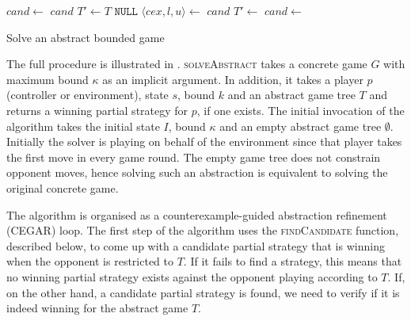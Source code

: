 \begin{algorithm}
    \begin{algorithmic}[1]
        \State $cand \gets $  
         \Return $cand$ \EndIIf {}
        \State $T' \gets T$
        \Loop
             
                \State \Return $\texttt{NULL}$
            \EndIf 
            \State $\langle cex, l, u \rangle \gets $  
             
                \State \Return $cand$ 
            \EndIf 
            \State $T' \gets $  
            \State $cand \gets $  
        \EndLoop
        \EndFunction
    \end{algorithmic}
    \caption{Solve an abstract bounded game}
    \label{alg:solveabstract}
\end{algorithm}


The full procedure is illustrated in . \textsc{solveAbstract} takes a concrete game $G$ with maximum bound $\kappa$ as an implicit argument.  In addition, it takes a player $p$ (controller or environment), state $s$, bound $k$ and an abstract game tree $T$ and returns a winning partial strategy for $p$, if one exists.  The initial invocation of the algorithm takes the initial state $I$, bound $\kappa$ and an empty abstract game tree $\emptyset$.  Initially the solver is playing on behalf of the environment since that player takes the first move in every game round.  The empty game tree does not constrain opponent moves, hence solving such an abstraction is equivalent to solving the original concrete game.  

The algorithm is organised as a counterexample-guided abstraction refinement (CEGAR) loop.  The first step of the algorithm uses the \textsc{findCandidate} function, described below, to come up with a candidate partial strategy that is winning when the opponent is restricted to $T$.  If it fails to find a strategy, this means that no winning partial strategy exists against the opponent playing according to $T$.  If, on the other hand, a candidate partial strategy is found, we need to verify if it is indeed winning for the abstract game $T$.

